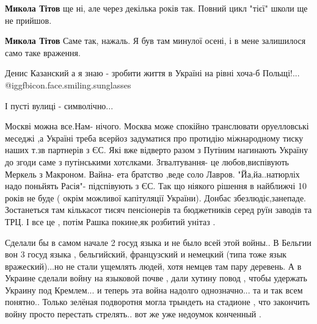 \begin{itemize}
\begin{itemize} %
\textbf{Микола Тітов} ще ні, але через декілька років так. Повний цикл "тієї" школи ще не прийшов.

\textbf{Микола Тітов} Саме так, нажаль. Я був там минулої осені, і в мене залишилося само таке враження.
\end{itemize} %

Денис Казанский а я знаю - зробити життя в Україні на рівні хоча-б Польщі!... @igg{fbicon.face.smiling.sunglasses} 

І пусті вулиці - символічно...


\obeycr
Москві можна все.Нам- нічого.
Москва може спокійно транслювати оруелловські меседжі
,а Україні треба всерйоз задуматися про протидію міжнародному тиску наших т.зв партнерів з ЄС.
Які вже відверто разом з Путіним нагинають Україну до згоди саме з путінськими хотєлками.
Згвалтування- це любов,виспівують Меркель з Макроном.
Вайна- ета братство ,веде соло Лавров.
"Йа,йа..натюрліх надо поньйять Расія"- підспівують з ЄС.
Так що ніякого рішення в найближчі 10 років не буде ( окрім можливої капітуляції України).
Донбас збезлюдіє,занепаде.
Зостанеться там кількасот тисяч пенсіонерів та бюджетників серед руїн заводів та ТРЦ.
І все це , потім Рашка покине,як розбитий унітаз .
\restorecr


Сделали бы в самом начале 2 госуд языка и не было всей этой войны.. В Бельгии
вон 3 госуд языка , бельгийский, французский и немецкий (типа тоже язык
вражеский)...но не стали ущемлять людей, хотя немцев там пару деревень. А в
Украине сделали войну на языковой почве , дали хутину повод , чтобы удержать
Украину под Кремлем... и теперь эта война надолго однозначно... та и так всем
понятно.. Только зелёная подворотня могла трындеть на стадионе , что закончить
войну просто перестать стрелять.. вот же уже недоумок конченный .

\end{itemize} %
